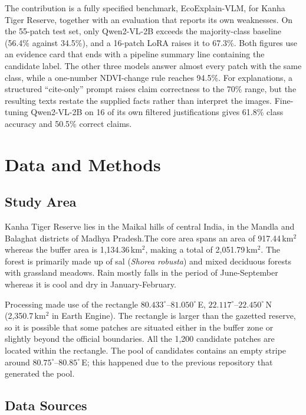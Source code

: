 The contribution is a fully specified benchmark, EcoExplain-VLM, for
Kanha Tiger Reserve, together with an evaluation that reports its own
weaknesses. On the 55-patch test set, only Qwen2-VL-2B exceeds the
majority-class baseline (56.4\% against 34.5\%), and a 16-patch LoRA
raises it to 67.3\%. Both figures use an evidence card that ends with a
pipeline summary line containing the candidate label. The other three
models answer almost every patch with the same class, while a
one-number NDVI-change rule reaches 94.5\%. For explanations, a
structured ``cite-only'' prompt raises claim correctness to the 70\%
range, but the resulting texts restate the supplied facts rather than
interpret the images. Fine-tuning Qwen2-VL-2B on 16 of its own filtered
justifications gives 61.8\% class accuracy and 50.5\% correct claims.


\section{Data and Methods}

\subsection{Study Area}

Kanha Tiger Reserve lies in the Maikal hills of central India, in the
Mandla and Balaghat districts of Madhya Pradesh.The core area spans an area of
917.44\,km$^2$ whereas the buffer area is 1,134.36\,km$^2$, making a total
of 2,051.79\,km$^2$. The forest is primarily made up of sal (\emph{Shorea
robusta}) and mixed deciduous forests with grassland meadows. Rain mostly
falls in the period of June-September whereas it is cool and dry in
January-February.

Processing made use of the rectangle
$80.433^\circ$--$81.050^\circ$\,E,
$22.117^\circ$--$22.450^\circ$\,N (2,350.7\,km$^2$ in Earth Engine).
The rectangle is larger than the gazetted reserve, so it is possible
that some patches are situated either in the buffer zone or slightly
beyond the official boundaries. All the 1,200 candidate patches are
located within the rectangle. The pool of candidates contains an empty
stripe around $80.75^\circ$--$80.85^\circ$\,E; this happened due to
the previous repository that generated the pool.

\subsection{Data Sources}

